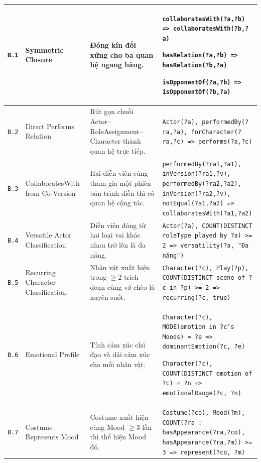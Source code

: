 \begin{longtable}{|p{0.9cm}|p{3.0cm}|p{4.0cm}|p{6.4cm}|}
  \texttt{B.1}
  & Symmetric Closure
  & Đóng kín đối xứng cho ba quan hệ ngang hàng.
  & \texttt{collaboratesWith(?a,?b) => collaboratesWith(?b,?a)}\par
    \texttt{hasRelation(?a,?b) => hasRelation(?b,?a)}\par
    \texttt{isOpponentOf(?a,?b) => isOpponentOf(?b,?a)} \\
  \hline

  \texttt{B.2}
  & Direct Performs Relation
  & Rút gọn chuỗi Actor--RoleAssignment--Character thành quan hệ trực tiếp.
  & \texttt{Actor(?a), performedBy(?ra,?a),
    forCharacter(?ra,?c) => performs(?a,?c)} \\
  \hline

  \texttt{B.3}
  & CollaboratesWith from Co-Version
  & Hai diễn viên cùng tham gia một phiên bản trình diễn thì có quan hệ cộng tác.
  & \texttt{performedBy(?ra1,?a1), inVersion(?ra1,?v),
    performedBy(?ra2,?a2), inVersion(?ra2,?v),
    notEqual(?a1,?a2) => collaboratesWith(?a1,?a2)} \\
  \hline

  \texttt{B.4}
  & Versatile Actor Classification
  & Diễn viên đóng từ hai loại vai khác nhau trở lên là đa năng.
  & \texttt{Actor(?a), COUNT(DISTINCT roleType played by ?a) >= 2
    => versatility(?a, "Đa năng")}\par \\
  \hline

  \texttt{B.5}
  & Recurring Character Classification
  & Nhân vật xuất hiện trong $\geq 2$ trích đoạn cùng vở chèo là xuyên suốt.
  & \texttt{Character(?c), Play(?p),
    COUNT(DISTINCT scene of ?c in ?p) >= 2
    => recurring(?c, true)}\par\\
  \hline

  \texttt{B.6}
  & Emotional Profile
  & Tính cảm xúc chủ đạo và dải cảm xúc cho mỗi nhân vật.
  & \texttt{Character(?c), MODE(emotion in ?c's Moods) = ?e
    => dominantEmotion(?c, ?e)}\par
    \texttt{Character(?c), COUNT(DISTINCT emotion of ?c) = ?n
    => emotionalRange(?c, ?n)}\par \\
  \hline

  \texttt{B.7}
  & Costume Represents Mood
  & Costume xuất hiện cùng Mood $\geq 3$ lần thì thể hiện Mood đó.
  & \texttt{Costume(?co), Mood(?m),
    COUNT(?ra : hasAppearance(?ra,?co), hasAppearance(?ra,?m)) >= 3
    => represent(?co, ?m)}\par\\
  \hline


\end{longtable}
